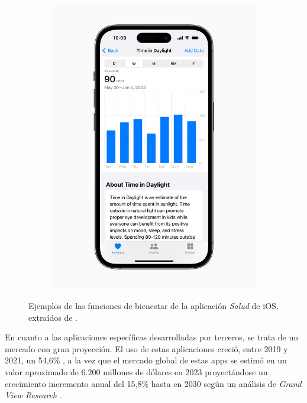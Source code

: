 \begin{figure}[h]
\begin{subfigure}[t]{0.49\textwidth}
                \includegraphics[width=1\linewidth]{figures/ios salud visual.jpg}
            \end{subfigure}
            \caption[Ejemplos de las funciones de bienestar de la aplicación \textit{Salud} de iOS]{Ejemplos de las funciones de bienestar de la aplicación \textit{Salud} de iOS, extraídos de \cite{apple_newsroom_apple_2023}.}
            \label{fig:estado_arte:ios_salud}
        \end{figure}

        En cuanto a las aplicaciones específicas desarrolladas por terceros, se trata de un mercado con gran proyección. El uso de estas aplicaciones creció, entre 2019 y 2021, un 54,6\% \cite{bejerano_lado_2023}, a la vez que el mercado global de estas apps se estimó en un valor aproximado de $6.200$ millones de dólares en 2023 proyectándose un crecimiento incremento anual del 15,8\% hasta en 2030 según un análisis de \textit{Grand View Research} \cite{grand_view_research_mental_nodate}.
        
